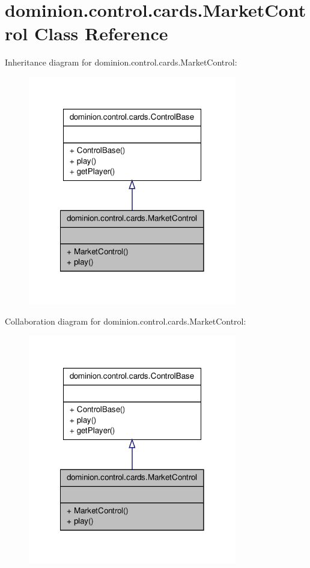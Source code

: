 \hypertarget{classdominion_1_1control_1_1cards_1_1MarketControl}{\section{dominion.\-control.\-cards.\-Market\-Control \-Class \-Reference}
\label{classdominion_1_1control_1_1cards_1_1MarketControl}
}


\-Inheritance diagram for dominion.\-control.\-cards.\-Market\-Control\-:
\nopagebreak
\begin{figure}[H]
\begin{center}
\leavevmode
\includegraphics[width=258pt]{classdominion_1_1control_1_1cards_1_1MarketControl__inherit__graph}
\end{center}
\end{figure}


\-Collaboration diagram for dominion.\-control.\-cards.\-Market\-Control\-:
\nopagebreak
\begin{figure}[H]
\begin{center}
\leavevmode
\includegraphics[width=258pt]{classdominion_1_1control_1_1cards_1_1MarketControl__coll__graph}
\end{center}
\end{figure}
